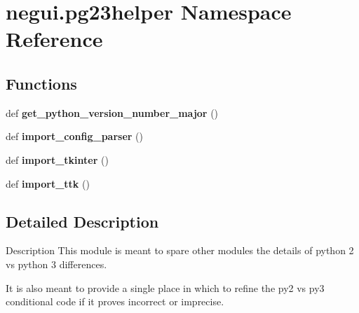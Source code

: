 \hypertarget{namespacenegui_1_1pg23helper}{}\section{negui.\+pg23helper Namespace Reference}
\label{namespacenegui_1_1pg23helper}
\subsection*{Functions}
\begin{DoxyCompactItemize}
\item 
def {\bfseries get\+\_\+python\+\_\+version\+\_\+number\+\_\+major} ()\hypertarget{namespacenegui_1_1pg23helper_a2e338d2e3213134bfc5ff70a4a5a780b}{}\label{namespacenegui_1_1pg23helper_a2e338d2e3213134bfc5ff70a4a5a780b}

\item 
def {\bfseries import\+\_\+config\+\_\+parser} ()\hypertarget{namespacenegui_1_1pg23helper_af94ba0769b242e3f44f22b817c3cf70c}{}\label{namespacenegui_1_1pg23helper_af94ba0769b242e3f44f22b817c3cf70c}

\item 
def {\bfseries import\+\_\+tkinter} ()\hypertarget{namespacenegui_1_1pg23helper_aaa698a62a5a15c7ad2c2a213d40fc238}{}\label{namespacenegui_1_1pg23helper_aaa698a62a5a15c7ad2c2a213d40fc238}

\item 
def {\bfseries import\+\_\+ttk} ()\hypertarget{namespacenegui_1_1pg23helper_af727ff1f304e5fa8002533ffc8fec274}{}\label{namespacenegui_1_1pg23helper_af727ff1f304e5fa8002533ffc8fec274}

\end{DoxyCompactItemize}


\subsection{Detailed Description}
\begin{DoxyVerb}Description
This module is meant to spare other modules
the details of python 2 vs python 3 differences. 

It is also meant to provide a single place in which
to refine the py2 vs py3 conditional code if it proves 
incorrect or imprecise.
\end{DoxyVerb}
 